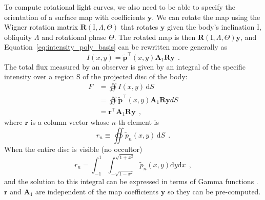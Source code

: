 \documentclass[12pt,dvipsnames]{report}
\newcommand{\ud}{\,\mathrm{d}}
\renewcommand{\vec}[1]{\boldsymbol{\mathbf{#1}}}
\newcommand{\hquad}{~~}
\begin{document}
To compute rotational light curves, we also need to be able to specify the
orientation of a surface map with coefficients $\mathbf y$. We can rotate the
map using the Wigner rotation matrix $\mathbf{R}(\mathrm{I}, \Lambda, \Theta)$
that rotates $\vec y$ given the body's inclination $\mathrm{I}$, obliquity $\Lambda$
and rotational phase $\Theta$. The rotated map is then $\mathbf{R}(\mathrm{I},
    \Lambda, \Theta) \mathbf{y}$, and Equation~\ref{eq:intensity_poly_basis} can be
rewritten more generally as
\begin{equation}
    I(x, y)=\tilde{\mathbf{p}}^{\intercal}(x, y) \mathbf{A}_1 \mathbf{R}\mathbf{y}
    \hquad.
\end{equation}
The total flux measured by an observer is given by an integral of the specific
intensity over a region S of the projected disc of the body:
\begin{align}
    F & =\oiint I(x, y) \ud S                                                                 \\
      & =\oiint \tilde{\mathbf{p}}^{\intercal}(x, y) \mathbf{A}_{1} \mathbf{R} \mathbf{y} d S \\
      & =\mathbf{r}^{\intercal} \mathbf{A}_{1} \mathbf{R} \mathbf{y}
      \hquad,
\end{align}
where $\mathbf{r}$ is a column vector whose $n$-th element is \citep{2019AJ....157...64L}
\begin{equation}
    r_{n} \equiv \oiint \tilde{p}_{n}(x, y) \ud S
    \hquad.
\end{equation}
When the entire disc is visible (no occultor)
\begin{equation}
    r_{n}=\int_{-1}^{1} \int_{-\sqrt{1-x^{2}}}^{\sqrt{1+x^{2}}} \tilde{p}_{n}(x, y) \mathrm{d}y \mathrm{d} x
    \hquad,
\end{equation}
and the solution to this integral can be expressed in terms of Gamma functions
\citep[Equation 20 in ][]{2019AJ....157...64L}.
$\mathbf{r}$ and $\mathbf{A}_1$ are independent of the map coefficients $\mathbf{y}$
so they can be pre-computed.
\end{document}
